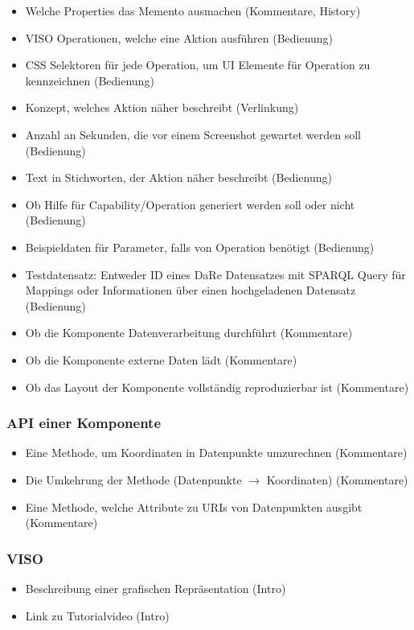 \documentclass[
	headsepline,
	footsepline,
	fontsize=12pt,
	bibliography=totoc
]{scrbook}
\begin{document}
\begin{itemize}
	\item Welche Properties das Memento ausmachen (Kommentare, History)
	\item VISO Operationen, welche eine Aktion ausführen (Bedienung)
	\item CSS Selektoren für jede Operation, um UI Elemente für Operation zu kennzeichnen (Bedienung)
	\item Konzept, welches Aktion näher beschreibt (Verlinkung)
	\item Anzahl an Sekunden, die vor einem Screenshot gewartet werden soll (Bedienung)
	\item Text in Stichworten, der Aktion näher beschreibt (Bedienung)
	\item Ob Hilfe für Capability/Operation generiert werden soll oder nicht (Bedienung)
	\item Beispieldaten für Parameter, falls von Operation benötigt (Bedienung)
	\item Testdatensatz: Entweder ID eines DaRe Datensatzes mit SPARQL Query für Mappings oder Informationen über einen hochgeladenen Datensatz (Bedienung)
	\item Ob die Komponente Datenverarbeitung durchführt (Kommentare)
	\item Ob die Komponente externe Daten lädt (Kommentare)
	\item Ob das Layout der Komponente vollständig reproduzierbar ist (Kommentare)
\end{itemize}

\subsubsection{API einer Komponente}

\begin{itemize}
	\item Eine Methode, um Koordinaten in Datenpunkte umzurechnen (Kommentare)
	\item Die Umkehrung der Methode (Datenpunkte $\to$ Koordinaten) (Kommentare)
	\item Eine Methode, welche Attribute zu URIs von Datenpunkten ausgibt (Kommentare)
\end{itemize}

\subsubsection{VISO}

\begin{itemize}
	\item Beschreibung einer grafischen Repräsentation (Intro)
	\item Link zu Tutorialvideo (Intro)
\end{itemize}
\end{document}
